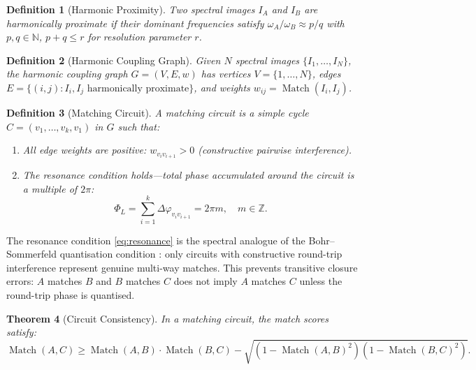 \documentclass[11pt,twocolumn,a4paper]{article}
\newtheorem{theorem}{Theorem}[section]
\newtheorem{definition}[theorem]{Definition}
\newcommand{\N}{\mathbb{N}}
\newcommand{\Z}{\mathbb{Z}}
\DeclareMathOperator{\Match}{Match}
\begin{document}
\begin{definition}[Harmonic Proximity]
\label{def:harmonic_proximity}
Two spectral images $I_A$ and $I_B$ are \emph{harmonically proximate}
if their dominant frequencies satisfy $\omega_A / \omega_B \approx p/q$
with $p, q \in \N$, $p + q \leq r$ for resolution parameter $r$.
\end{definition}

\begin{definition}[Harmonic Coupling Graph]
\label{def:harmonic_graph}
Given $N$ spectral images $\{I_1, \ldots, I_N\}$, the harmonic
coupling graph $G = (V, E, w)$ has vertices $V = \{1, \ldots, N\}$,
edges $E = \{(i,j) : I_i, I_j \text{ harmonically proximate}\}$, and
weights $w_{ij} = \Match(I_i, I_j)$.
\end{definition}

\begin{definition}[Matching Circuit]
\label{def:matching_circuit}
A \emph{matching circuit} is a simple cycle $C = (v_1, \ldots, v_k, v_1)$
in $G$ such that:
\begin{enumerate}[label=(\roman*),nosep]
  \item All edge weights are positive: $w_{v_i v_{i+1}} > 0$ (constructive
    pairwise interference).
  \item The resonance condition holds---total phase accumulated around
    the circuit is a multiple of $2\pi$:
    \begin{equation}
    \label{eq:resonance}
      \Phi_L = \sum_{i=1}^{k} \Delta\varphi_{v_i v_{i+1}} = 2\pi m,
      \quad m \in \Z.
    \end{equation}
\end{enumerate}
\end{definition}

The resonance condition \eqref{eq:resonance} is the spectral analogue
of the Bohr--Sommerfeld quantisation condition \citep{bohr1913}: only
circuits with constructive round-trip interference represent genuine
multi-way matches. This prevents transitive closure errors: $A$ matches
$B$ and $B$ matches $C$ does not imply $A$ matches $C$ unless the
round-trip phase is quantised.


\begin{theorem}[Circuit Consistency]
\label{thm:circuit_consistency}
In a matching circuit, the match scores satisfy:
\begin{equation}
\label{eq:circuit_inequality}
  \Match(A, C) \geq \Match(A, B) \cdot \Match(B, C)
    - \sqrt{(1 - \Match(A,B)^2)(1 - \Match(B,C)^2)}.
\end{equation}
\end{theorem}
\end{document}
